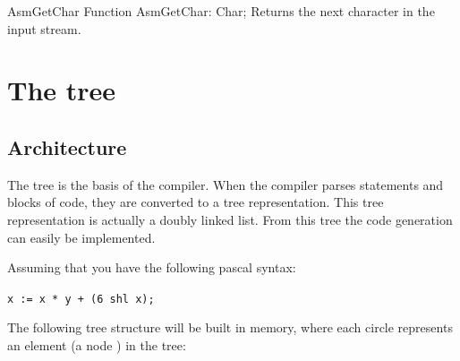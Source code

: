 \documentclass [12pt]{article}
\begin{document}
\begin{function}{AsmGetChar}
\Declaration
Function AsmGetChar: Char;
\Description
Returns the next character in the input stream.  
\end{function}


\section{The tree}
\label{sec:mylabel2}

\subsection{Architecture}
\label{subsec:architecturenext}

The tree is the basis of the compiler. When the compiler parses statements
and blocks of code, they are converted to a tree representation. This tree
representation is actually a doubly linked list. From this tree the code
generation can easily be implemented.

Assuming that you have the following pascal syntax:

\lstinline!x := x * y + (6 shl x);!

The following tree structure will be built in memory, where each circle 
represents an element (a node ) in the tree:
\end{document}
